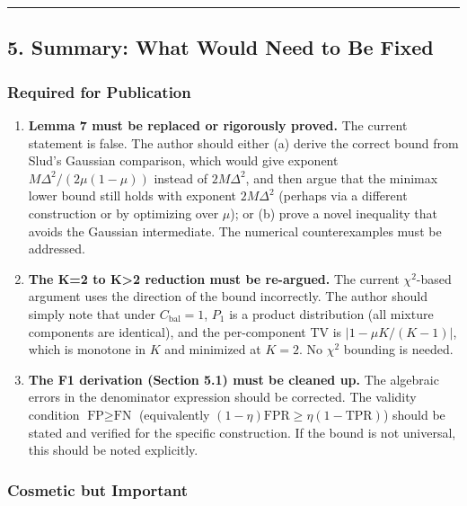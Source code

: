 \documentclass[
  12pt,
]{ctexart}
\begin{document}
\begin{center}\rule{0.5\linewidth}{0.5pt}\end{center}

\subsection{5. Summary: What Would Need to Be
Fixed}\label{summary-what-would-need-to-be-fixed}

\subsubsection{Required for Publication}\label{required-for-publication}

\begin{enumerate}
\def\labelenumi{\arabic{enumi}.}
\item
  \textbf{Lemma 7 must be replaced or rigorously proved.} The current
  statement is false. The author should either (a) derive the correct
  bound from Slud's Gaussian comparison, which would give exponent
  \(M\Delta^2/(2\mu(1-\mu))\) instead of \(2M\Delta^2\), and then argue
  that the minimax lower bound still holds with exponent \(2M\Delta^2\)
  (perhaps via a different construction or by optimizing over \(\mu\));
  or (b) prove a novel inequality that avoids the Gaussian intermediate.
  The numerical counterexamples must be addressed.
\item
  \textbf{The K=2 to K\textgreater2 reduction must be re-argued.} The
  current \(\chi^2\)-based argument uses the direction of the bound
  incorrectly. The author should simply note that under
  \(C_{\text{bal}}=1\), \(P_1\) is a product distribution (all mixture
  components are identical), and the per-component TV is
  \(|1-\mu K/(K-1)|\), which is monotone in \(K\) and minimized at
  \(K=2\). No \(\chi^2\) bounding is needed.
\item
  \textbf{The F1 derivation (Section 5.1) must be cleaned up.} The
  algebraic errors in the denominator expression should be corrected.
  The validity condition \(\text{FP} \geq \text{FN}\) (equivalently
  \((1-\eta)\text{FPR} \geq \eta(1-\text{TPR})\)) should be stated and
  verified for the specific construction. If the bound is not universal,
  this should be noted explicitly.
\end{enumerate}

\subsubsection{Cosmetic but Important}\label{cosmetic-but-important}
\end{document}
